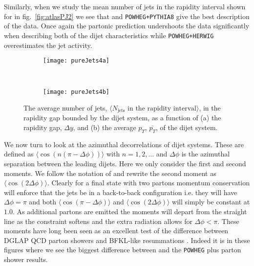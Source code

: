 	Similarly, when we study the mean number of jets in the rapidity interval shown for in
	fig.~\eqref{fig:atlasPJ2} we see that \HEJA and \texttt{POWHEG+PYTHIA8} give the best
	description of the data.  Once again the partonic \HEJ prediction undershoots the data
	significantly when describing both of the dijet characteristics while \texttt{POWHEG+HERWIG}
	overestimates the jet activity.

	\begin{figure}[bth]
		\begin{subfigure}[b]{0.48\textwidth}
			\texttt{[image: pureJets4a]}
			\caption{}
			\label{fig:}
		\end{subfigure}
		~
		\begin{subfigure}[b]{0.48\textwidth}
			\texttt{[image: pureJets4b]}
			\caption{}
			\label{fig:}
		\end{subfigure}
		\caption{The average number of jets, $\langle N_{\text{jets}}
		\text{ in the rapidity interval}\rangle$, in the rapidity gap
		         bounded by the dijet system, as a function of (a) the
		         rapidity gap, $\Delta y$, and (b) the average $p_T$,
		         $\overline{p_T}$, of the dijet system.}
		\label{fig:atlasPJ2}
	\end{figure}

	We now turn to look at the azimuthal decorrelations of dijet systems.  These are defined
	as $\langle\cos(n(\pi-\Delta\phi))\rangle$ with $n=1, 2, \ldots$ and $\Delta\phi$ is the azimuthal separation between the leading dijets.  Here we only consider
	the first and second moments.  We follow the notation of \cite{Aad:2014pua}
	and rewrite the second moment as $\langle\cos(2\Delta\phi)\rangle$.  Clearly for a final state
	with two partons momentum conservation will enforce that the jets be in a back-to-back configuration
	i.e. they will have $\Delta \phi=\pi$ and both $\langle\cos(\pi-\Delta\phi)\rangle$ and
	$\langle\cos(2\Delta\phi)\rangle$ will simply be constant at $1.0$.  As additional
	partons are emitted the moments will depart from the straight line as the constraint softens
	and the extra radiation allows for $\Delta\phi<\pi$.  These moments have long been seen
	as an excellent test of the difference between DGLAP QCD parton showers and BFKL-like
	resummations \cite{Ducloue:2012bm}.  Indeed it is in these figures where we see the biggest
	difference between \HEJ and the \texttt{POWHEG} plus parton shower results.

